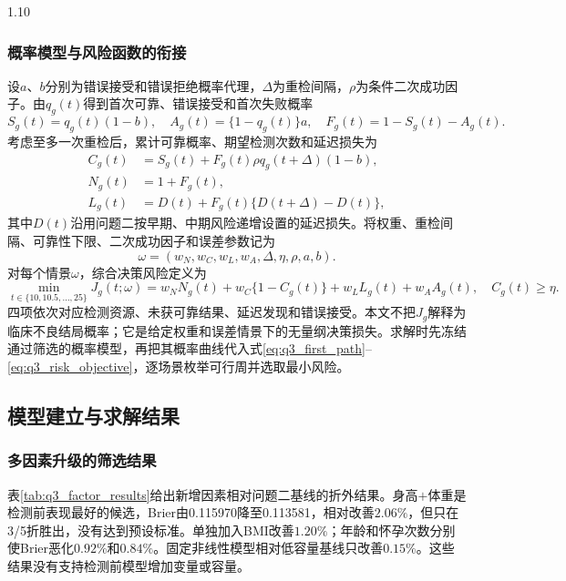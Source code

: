 \documentclass[12pt,a4paper]{ctexrep}
\numberwithin{equation}{section}
\begin{document}
\begin{spacing}{1.10}
{			\subsubsection{概率模型与风险函数的衔接}
			设$a$、$b$分别为错误接受和错误拒绝概率代理，$\Delta$为重检间隔，$\rho$为条件二次成功因子。由$q_g(t)$得到首次可靠、错误接受和首次失败概率
			\begin{equation}
			S_g(t)=q_g(t)(1-b),\quad
			A_g(t)=\{1-q_g(t)\}a,\quad
			F_g(t)=1-S_g(t)-A_g(t).
			\label{eq:q3_first_path}
			\end{equation}
			考虑至多一次重检后，累计可靠概率、期望检测次数和延迟损失为
			\begin{equation}
			\begin{aligned}
			C_g(t)&=S_g(t)+F_g(t)\rho q_g(t+\Delta)(1-b),\\
			N_g(t)&=1+F_g(t),\\
			L_g(t)&=D(t)+F_g(t)\{D(t+\Delta)-D(t)\},
			\end{aligned}
			\label{eq:q3_path_outputs}
			\end{equation}
			其中$D(t)$沿用问题二按早期、中期风险递增设置的延迟损失。将权重、重检间隔、可靠性下限、二次成功因子和误差参数记为
			\[
			\omega=(w_N,w_C,w_L,w_A,\Delta,\eta,\rho,a,b).
			\]
			对每个情景$\omega$，综合决策风险定义为
			\begin{equation}
			\min_{t\in\{10,10.5,\ldots,25\}}
			J_g(t;\omega)=w_NN_g(t)+w_C\{1-C_g(t)\}
			+w_LL_g(t)+w_AA_g(t),
			\quad C_g(t)\geq\eta.
			\label{eq:q3_risk_objective}
			\end{equation}
			四项依次对应检测资源、未获可靠结果、延迟发现和错误接受。本文不把$J_g$解释为临床不良结局概率；它是给定权重和误差情景下的无量纲决策损失。求解时先冻结通过筛选的概率模型，再把其概率曲线代入式\eqref{eq:q3_first_path}--\eqref{eq:q3_risk_objective}，逐场景枚举可行周并选取最小风险。

			\subsection{模型建立与求解结果}
			\subsubsection{多因素升级的筛选结果}
			表\ref{tab:q3_factor_results}给出新增因素相对问题二基线的折外结果。身高$+$体重是检测前表现最好的候选，Brier由0.115970降至0.113581，相对改善$2.06\%$，但只在3/5折胜出，没有达到预设标准。单独加入BMI改善$1.20\%$；年龄和怀孕次数分别使Brier恶化$0.92\%$和$0.84\%$。固定非线性模型相对低容量基线只改善$0.15\%$。这些结果没有支持检测前模型增加变量或容量。

}
\end{spacing}
\end{document}
